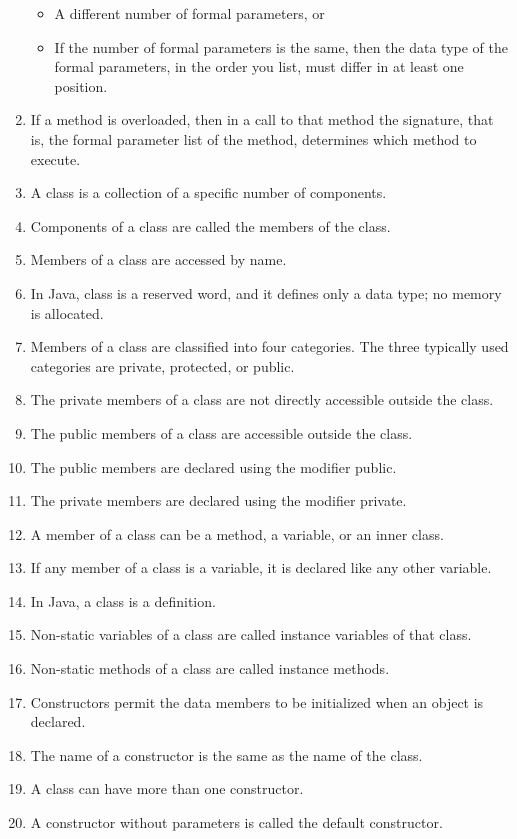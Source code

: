 \documentclass[12pt,a4paper,final,twoside,onecolumn,titlepage]{book}
\begin{document}
\begin{enumerate}
\begin{itemize}
\item A different number of formal parameters, or
\item If the number of formal parameters is the same, then the data type of the formal parameters, in the order you list, must differ in at least one position.
\end{itemize}
\item If a method is overloaded, then in a call to that method the signature, that is, the formal parameter list of the method, determines which method to execute.
\item A class is a collection of a specific number of components.
\item Components of a class are called the members of the class.
\item Members of a class are accessed by name.
\item In Java, class is a reserved word, and it defines only a data type; no memory is allocated.
\item Members of a class are classified into four categories. The three typically used categories are private, protected, or public.
\item The private members of a class are not directly accessible outside the class.
\item The public members of a class are accessible outside the class.
\item The public members are declared using the modifier public.
\item The private members are declared using the modifier private.
\item A member of a class can be a method, a variable, or an inner class.
\item If any member of a class is a variable, it is declared like any other variable.
\item In Java, a class is a definition.
\item Non-static variables of a class are called instance variables of that class.
\item Non-static methods of a class are called instance methods.
\item Constructors permit the data members to be initialized when an object is declared.
\item The name of a constructor is the same as the name of the class.
\item A class can have more than one constructor.
\item A constructor without parameters is called the default constructor.

\end{enumerate}
\end{document}

